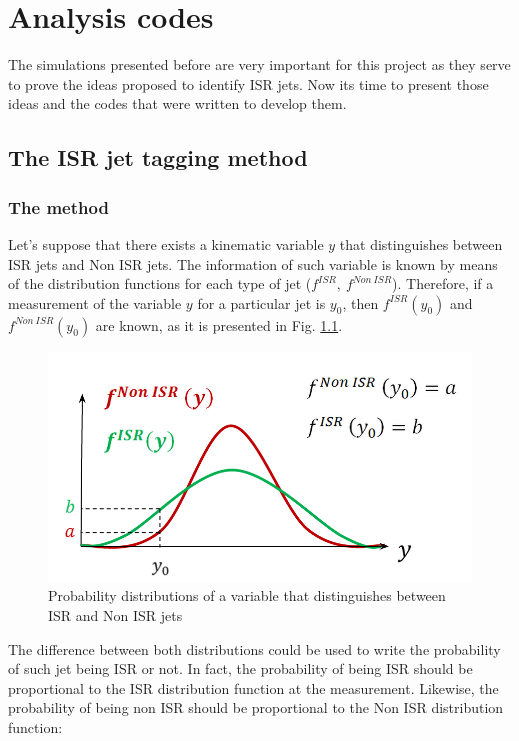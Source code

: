 \documentclass[12pt, oneside]{book}              %
\begin{document}
\chapter{Analysis codes}\label{cha:Analysis_codes}

The simulations presented before are very important for this project 
as they serve to prove the ideas proposed to identify ISR jets. 
Now its time to present those ideas and the codes that were written
to develop them.

\section{The ISR jet tagging method} \label{sec:Method}

\subsection{The method} \label{subsec:Method}

Let's suppose that there exists a kinematic variable $y$ that distinguishes between ISR jets and Non
ISR jets. The information of such variable is known by means of the distribution functions for each 
type of jet ($f^{ISR},\ f^{Non\ ISR}$). Therefore, if a measurement of the variable $y$ for a
particular jet is $y_0$, then $f^{ISR}(y_0)$ and $f^{Non\ ISR}(y_0)$ are known, as it is presented 
in Fig. \ref{fig:Prob_ISR_Non}.

\begin{figure}[h]
	\centering
	\includegraphics[width=0.5\linewidth]{./Imags_Doc/Prob_ISR_Non}
	\caption[Probability distributions ISR - Non ISR]{Probability distributions of a variable that distinguishes between ISR and Non ISR jets}
	\label{fig:Prob_ISR_Non}
\end{figure}

The difference between both distributions could be used to write the probability of such jet being
ISR or not. In fact, the probability of being ISR should be proportional to the ISR distribution
function at the measurement. Likewise, the probability of being non ISR should be proportional to
the Non ISR distribution function:
\end{document}
